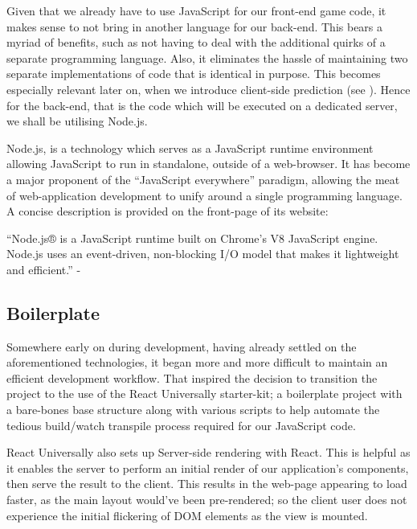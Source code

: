 \documentclass{standalone}
\begin{document}
			Given that we already have to use JavaScript for our front-end game code, it makes sense to not bring in another language for our back-end. This bears a myriad of benefits, such as not having to deal with the additional quirks of a separate programming language. Also, it eliminates the hassle of maintaining two separate implementations of code that is identical in purpose. This becomes especially relevant later on, when we introduce client-side prediction (see ). Hence for the back-end, that is the code which will be executed on a dedicated server, we shall be utilising Node.js\parencite{NodeJs}.

			Node.js, is a technology which serves as a JavaScript runtime environment allowing JavaScript to run in standalone, outside of a web-browser. It has become a major proponent of the \enquote{JavaScript everywhere} paradigm, allowing the meat of web-application development to unify around a single programming language. A concise description is provided on the front-page of its website:
			\begin{formal}
				\enquote{Node.js® is a JavaScript runtime built on Chrome's V8 JavaScript engine. Node.js uses an event-driven, non-blocking I/O model that makes it lightweight and efficient.} - \cite{NodeJs}
			\end{formal}

		\subsection{Boilerplate} \label{sec:boilerplate}
			Somewhere early on during development, having already settled on the aforementioned technologies, it began more and more difficult to maintain an efficient development workflow. That inspired the decision to transition the project to the use of the React Universally \parencite{ReactUniversally} starter-kit; a boilerplate project with a bare-bones base structure along with various scripts to help automate the tedious build/watch transpile process required for our JavaScript code.

			React Universally also sets up Server-side rendering with React. This is helpful as it enables the server to perform an initial render of our application's components, then serve the result to the client. This results in the web-page appearing to load faster, as the main layout would've been pre-rendered; so the client user does not experience the initial flickering of DOM elements as the view is mounted.
\end{document}
